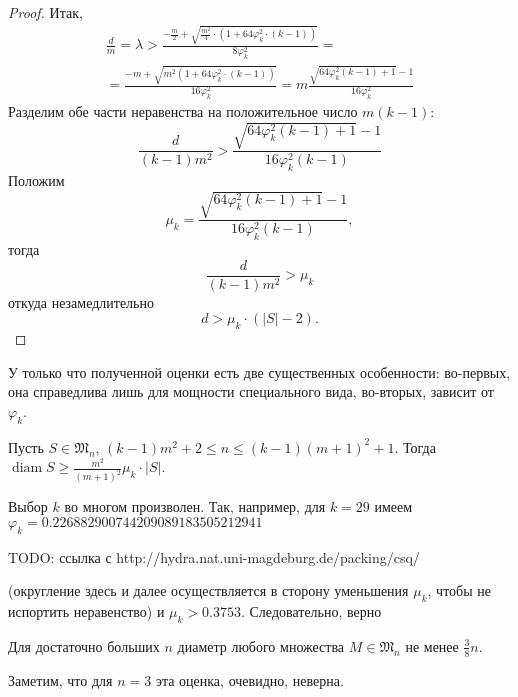 \begin{proof}
	Итак,
	\begin{multline}
		\frac{d}{m} = \lambda >
		\frac{-\frac{m}{2} + \sqrt{\frac{m^2}{4} \cdot (1 + 64 \varphi_k^2 \cdot (k-1))} }{8 \varphi_k^2}
		=\\=
		\frac{-m + \sqrt{m^2  (1 + 64 \varphi_k^2 \cdot (k-1))} }{16 \varphi_k^2}
		=
		m\frac{ \sqrt{ 64 \varphi_k^2 (k-1) + 1} -1 }{16 \varphi_k^2}
	\end{multline}
	Разделим обе части неравенства на положительное число $m(k-1)$:
	\begin{equation}
		\frac{d}{(k-1)m^2}
		>
		\frac{ \sqrt{ 64 \varphi_k^2 (k-1) + 1} -1 }{16 \varphi_k^2 (k-1)}
	\end{equation}
	Положим
	\begin{equation}
		\mu_k = \frac{ \sqrt{ 64 \varphi_k^2 (k-1) + 1} -1 }{16 \varphi_k^2 (k-1)},
	\end{equation}
	тогда
	\begin{equation}
		\frac{d}{(k-1)m^2}
		>
		\mu_k
	\end{equation}
	откуда незамедлительно
	\begin{equation}
		d > \mu_k \cdot (|S|-2)
		.
	\end{equation}
\end{proof}

У только что полученной оценки есть две существенных особенности:
во-первых, она справедлива лишь для мощности специального вида,
во-вторых, зависит от $\varphi_k$.

\begin{corollary}
	\label{corollary:common_linear_bound}
	Пусть $S\in\mathfrak{M}_n$, $ (k-1)m^2 + 2 \leq n \leq (k-1)(m+1)^2 + 1$.
	Тогда $\operatorname{diam} S \geq \frac{m^2}{(m+1)^2} \mu_k \cdot |S|$.
\end{corollary}

Выбор $k$ во многом произволен.
Так, например, для $k=29$ имеем $\varphi_k=0.226882900744209089183505212941$

TODO: ссылка с http://hydra.nat.uni-magdeburg.de/packing/csq/

(округление здесь и далее осуществляется в сторону уменьшения $\mu_k$, чтобы не испортить неравенство)
и $\mu_k > 0.3753$.
Следовательно, верно
\begin{proposition}
	Для достаточно больших $n$ диаметр любого множества $M\in\mathfrak{M}_n$ не менее $\frac{3}{8}n$.
\end{proposition}
Заметим, что для $n=3$ эта оценка, очевидно, неверна.

